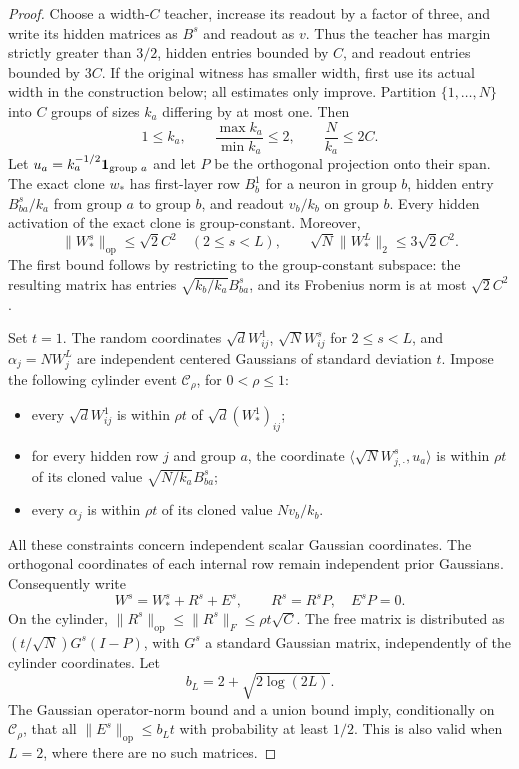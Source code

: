 \begin{proof}
Choose a width-$C$ teacher, increase its readout by a factor of three, and write
its hidden matrices as $B^s$ and readout as $v$. Thus the teacher has margin
strictly greater than $3/2$, hidden entries bounded by $C$, and readout entries
bounded by $3C$. If the original witness has smaller width, first use its actual
width in the construction below; all estimates only improve.
Partition $\{1,\ldots,N\}$ into $C$ groups of sizes $k_a$ differing by at most
one. Then
\[
 1\leq k_a,\qquad \frac{\max k_a}{\min k_a}\leq2,
 \qquad \frac N{k_a}\leq2C.
\]
Let $u_a=k_a^{-1/2}{\bf1}_{\text{group }a}$ and let $P$ be the orthogonal
projection onto their span. The exact clone $w_*$ has first-layer row $B^1_b$
for a neuron in group $b$, hidden entry $B^s_{ba}/k_a$ from group $a$ to group
$b$, and readout $v_b/k_b$ on group $b$. Every hidden activation of the exact
clone is group-constant. Moreover,
\[
 \|W_*^s\|_{\mathrm{op}}\leq\sqrt2 C^2\quad(2\leq s<L),
 \qquad \sqrt N\|W_*^L\|_2\leq3\sqrt2 C^2.
\]
The first bound follows by restricting to the group-constant subspace: the
resulting matrix has entries $\sqrt{k_b/k_a}B^s_{ba}$, and its Frobenius norm
is at most $\sqrt2 C^2$.

Set $t=1$. The random coordinates
$\sqrt d W^1_{ij}$, $\sqrt N W^s_{ij}$ for $2\leq s<L$, and
$\alpha_j=NW^L_j$ are independent centered Gaussians of standard deviation
$t$. Impose the following cylinder event $\mathcal C_\rho$, for
$0<\rho\leq1$:
\begin{itemize}
\item every $\sqrt d W^1_{ij}$ is within $\rho t$ of
$\sqrt d (W_*^1)_{ij}$;
\item for every hidden row $j$ and group $a$, the coordinate
$\langle\sqrt N W^s_{j,\cdot},u_a\rangle$ is within $\rho t$ of its
cloned value $\sqrt{N/k_a}B^s_{ba}$;
\item every $\alpha_j$ is within $\rho t$ of its cloned value $Nv_b/k_b$.
\end{itemize}
All these constraints concern independent scalar Gaussian coordinates.
The orthogonal coordinates of each internal row remain independent prior
Gaussians. Consequently write
\[
 W^s=W_*^s+R^s+E^s,\qquad R^s=R^sP,\quad E^sP=0.
\]
On the cylinder, $\|R^s\|_{\mathrm{op}}\leq\|R^s\|_F\leq\rho t\sqrt C$.
The free matrix is distributed as $(t/\sqrt N)G^s(I-P)$, with $G^s$ a standard
Gaussian matrix, independently of the cylinder coordinates. Let
\[
 b_L=2+\sqrt{2\log(2L)}.
\]
The Gaussian operator-norm bound and a union bound imply, conditionally on
$\mathcal C_\rho$, that all $\|E^s\|_{\mathrm{op}}\leq b_Lt$ with probability
at least $1/2$. This is also valid when $L=2$, where there are no such matrices.


\end{proof}
